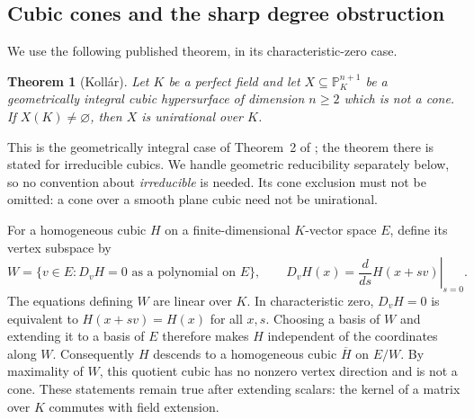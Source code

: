 \documentclass[11pt]{article}
\newtheorem{theorem}{Theorem}[section]
\theoremstyle{definition}
\begin{document}
\subsection{Cubic cones and the sharp degree obstruction}

We use the following published theorem, in its characteristic-zero case.
\begin{theorem}[Koll\'ar]\label{thm:kollar-input}
Let $K$ be a perfect field and let $X\subseteq\mathbb P^{n+1}_K$ be a
geometrically integral cubic hypersurface of dimension $n\ge2$ which is not a cone.
If $X(K)\neq\varnothing$, then $X$ is unirational over $K$.
\end{theorem}
This is the geometrically integral case of Theorem~2 of
\cite{lbKollar2002}; the theorem there is stated for irreducible cubics.
We handle geometric reducibility separately below, so no convention about
\emph{irreducible} is needed.  Its cone exclusion must not be omitted: a cone over a smooth plane cubic need not be unirational.

For a homogeneous cubic $H$ on a finite-dimensional $K$-vector space $E$,
define its vertex subspace by
\[
 W=\{v\in E:D_vH=0\text{ as a polynomial on }E\},
 \qquad D_vH(x)=\left.\frac{d}{ds}H(x+sv)\right|_{s=0}.
\]
The equations defining $W$ are linear over $K$.  In characteristic zero,
$D_vH=0$ is equivalent to $H(x+sv)=H(x)$ for all $x,s$.
Choosing a basis of $W$ and extending it to a basis of $E$ therefore makes
$H$ independent of the coordinates along $W$.
Consequently $H$ descends to a homogeneous cubic $\overline H$ on $E/W$.
By maximality of $W$, this quotient cubic has no nonzero vertex direction
and is not a cone.  These statements remain true after extending scalars:
the kernel of a matrix over $K$ commutes with field extension.
\end{document}
